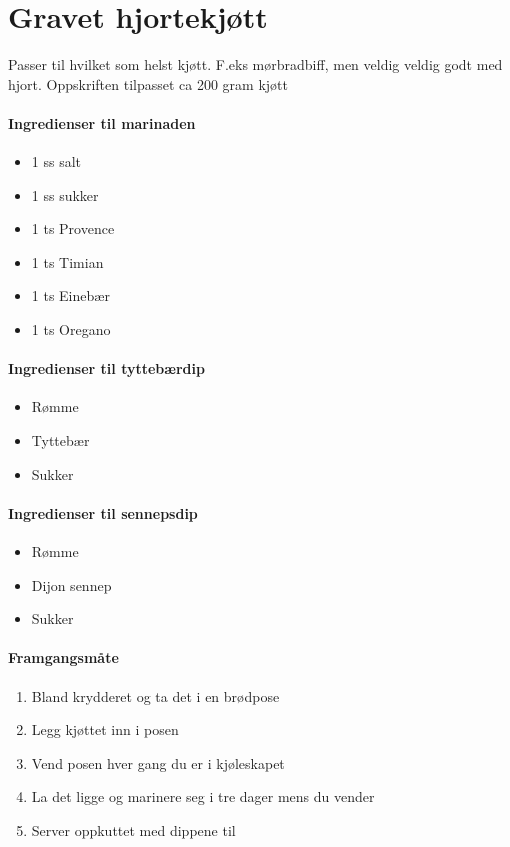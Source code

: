 \section{Gravet hjortekjøtt}
Passer til hvilket som helst kjøtt. F.eks mørbradbiff, men veldig veldig godt med hjort.
Oppskriften tilpasset ca 200 gram kjøtt

\paragraph{Ingredienser til marinaden}
\begin{itemize}[noitemsep]
	\item 1 ss salt
	\item 1 ss sukker
	\item 1 ts Provence
	\item 1 ts Timian
	\item 1 ts Einebær
	\item 1 ts Oregano
\end{itemize}

\paragraph{Ingredienser til tyttebærdip}
\begin{itemize}[noitemsep]
	\item Rømme
	\item Tyttebær
	\item Sukker
\end{itemize}

\paragraph{Ingredienser til sennepsdip}
\begin{itemize}[noitemsep]
	\item Rømme
	\item Dijon sennep
	\item Sukker
\end{itemize}

\paragraph{Framgangsmåte}
\begin{enumerate}[noitemsep]
	\item Bland krydderet og ta det i en brødpose
	\item Legg kjøttet inn i posen
	\item Vend posen hver gang du er i kjøleskapet
	\item La det ligge og marinere seg i tre dager mens du vender
	\item Server oppkuttet med dippene til
\end{enumerate}
